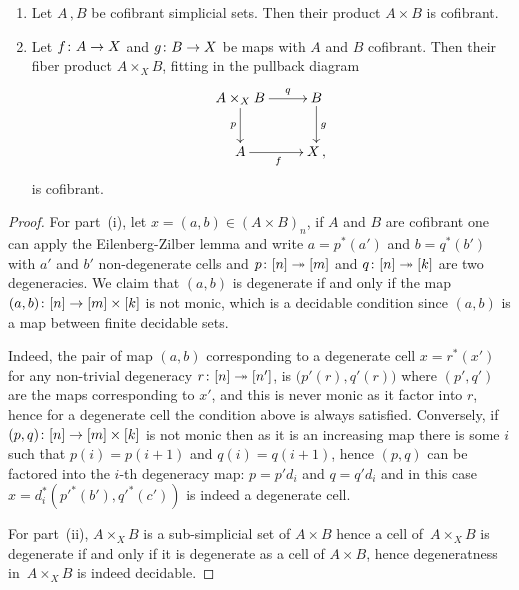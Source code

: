 \documentclass[reqno,10pt,a4paper,oneside,draft]{amsart}
\begin{document}
 












\begin{proposition}\label{lem:cofibrant_fiber_product} \hfill 
\begin{enumerate}[$(i)$] 
\item Let $A \, , B$ be cofibrant simplicial sets. Then their product $A \times B$ is cofibrant.
\item Let $f \colon A \to X$ and $g \colon B \to X$ be maps with $A$ and $B$ cofibrant. Then their
fiber product $A \times_X B$, fitting in the pullback diagram
\[
\xymatrix{
A \times_X B \ar[r]^-{q} \ar[d]_-{p} & B \ar[d]^g \\
A \ar[r]_f & X \, ,}
\]
is cofibrant.
\end{enumerate}
\end{proposition}

\begin{proof} For part~(i), let $x = (a,b) \in (A \times B)_n$, if $A$ and $B$ are cofibrant one can apply the Eilenberg-Zilber lemma and write $a = p^*(a')$ and $b = q^*(b')$ with $a'$ and $b'$ non-degenerate cells and $p \colon [n] \twoheadrightarrow [m]$ and $q \colon [n] \twoheadrightarrow [k]$ are two degeneracies. We claim that $(a,b)$ is degenerate if and only if the map $(a ,b )  \colon [n] \rightarrow [m] \times [k]$ is not monic, which is a decidable condition since $(a,b)$ is a map between finite decidable sets.

Indeed, the pair of map $(a,b)$ corresponding to a degenerate cell $x=r^*(x')$ for any non-trivial degeneracy $r \colon [n] \twoheadrightarrow [n']$, is  $\big( p'(r),q'(r) \big)$ where $(p',q')$ are the maps corresponding to $x'$, and this is never monic as it factor into $r$, hence for a degenerate cell the condition above is always satisfied. Conversely, if $(p,q)\colon [n] \rightarrow [m] \times [k]$ is not monic then as it is an increasing map there is some $i$ such that $p(i)=p(i+1)$ and $q(i)=q(i+1)$, hence $(p,q)$ can be factored into the $i$-th degeneracy map: $p=p' d_i$ and $q=q' d_i$ and in this case $x= d_i^* (p'^*(b'),q'^*(c'))$ is indeed a degenerate cell.


For part~(ii), $A \times_X B$ is a sub-simplicial set of $A \times B$ hence a cell of~$A \times_X B$ is degenerate if and only if it is degenerate as a cell of $A \times B$, hence degeneratness 
in~$A \times_X B$ is indeed decidable. 
\end{proof}
\end{document}
